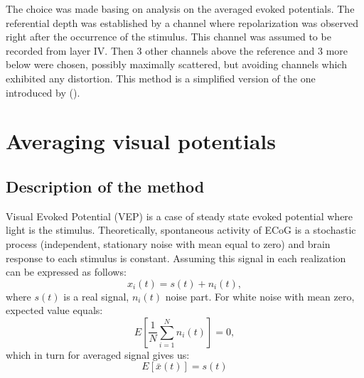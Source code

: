 \documentclass{pracalicmgr}
\begin{document}
   The choice was made basing on analysis on the averaged evoked potentials. The referential depth was established by a channel where repolarization was observed right after the occurrence of the stimulus. This channel was assumed to be recorded from layer IV. Then 3 other channels above the reference and 3 more below were chosen, possibly maximally scattered, but avoiding channels which exhibited any distortion. This method is a simplified version of the one introduced by (\cite{maier2011}).
   
   
   \section{Averaging visual potentials}
   
   \subsection{Description of the method}
   Visual Evoked Potential (VEP) is a case of steady state evoked potential where light is the stimulus. Theoretically, spontaneous activity of ECoG is a stochastic process (independent, stationary noise with mean equal to zero) and brain response to each stimulus is constant. 
   Assuming this signal in each realization can be expressed as follows:
   \begin{equation}
   x_i(t) = s(t) + n_i(t),
   \end{equation}
   where $s(t)$ is a real signal, $n_i(t)$ noise part. For white noise with mean zero, expected value equals:
   \begin{equation}
   E\left[ \frac{1}{N}\sum_{i=1}^{N} n_i(t)\right] = 0, 
   \end{equation}
   which in turn for averaged signal gives us:
   \begin{equation}
   E\left[ \bar{x}(t) \right] = s(t)
   \end{equation}
   
\end{document}

